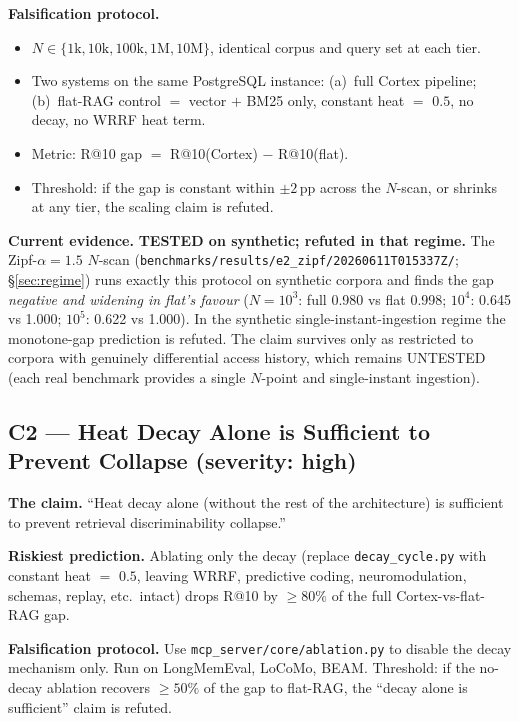 \documentclass[11pt]{article}
\begin{document}
\textbf{Falsification protocol.}
\begin{itemize}
  \item $N \in \{1\mathrm{k}, 10\mathrm{k}, 100\mathrm{k},
        1\mathrm{M}, 10\mathrm{M}\}$, identical corpus and query
        set at each tier.
  \item Two systems on the same PostgreSQL instance:
        (a)~full Cortex pipeline; (b)~flat-RAG control $=$
        vector $+$ BM25 only, constant heat $=$ $0.5$, no decay,
        no WRRF heat term.
  \item Metric: R@10 gap $=$ R@10(Cortex) $-$ R@10(flat).
  \item Threshold: if the gap is constant within $\pm 2$\,pp
        across the $N$-scan, or shrinks at any tier, the scaling
        claim is refuted.
\end{itemize}

\textbf{Current evidence.} \textbf{TESTED on synthetic; refuted in
that regime.}  The Zipf-$\alpha{=}1.5$ $N$-scan
(\texttt{benchmarks/results/e2\_zipf/20260611T015337Z/};
\S\ref{sec:regime}) runs exactly this protocol on synthetic corpora
and finds the gap \emph{negative and widening in flat's favour}
($N{=}10^3$: full 0.980 vs flat 0.998; $10^4$: 0.645 vs 1.000;
$10^5$: 0.622 vs 1.000).  In the synthetic single-instant-ingestion
regime the monotone-gap prediction is refuted.  The claim survives
only as restricted to corpora with genuinely differential access
history, which remains UNTESTED (each real benchmark provides a
single $N$-point and single-instant ingestion).

\subsection{C2 --- Heat Decay Alone is Sufficient to Prevent Collapse (severity: high)}
\label{app:popper-c2}

\textbf{The claim.} ``Heat decay alone (without the rest of the
architecture) is sufficient to prevent retrieval discriminability
collapse.''

\textbf{Riskiest prediction.}  Ablating only the decay (replace
\texttt{decay\_cycle.py} with constant heat $=$ $0.5$, leaving WRRF,
predictive coding, neuromodulation, schemas, replay, etc.\ intact)
drops R@10 by $\ge 80\%$ of the full Cortex-vs-flat-RAG gap.

\textbf{Falsification protocol.}  Use
\texttt{mcp\_server/core/ablation.py} to disable the decay
mechanism only.  Run on LongMemEval, LoCoMo, BEAM.  Threshold: if
the no-decay ablation recovers $\ge 50\%$ of the gap to flat-RAG,
the ``decay alone is sufficient'' claim is refuted.
\end{document}

